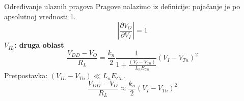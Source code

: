 \begin{frame}[label=09_1-s018]{Određivanje ulaznih pragova}\setlength{\parskip}{2pt}\setlength{\abovedisplayskip}{4pt}\setlength{\belowdisplayskip}{4pt}\setlength{\abovedisplayshortskip}{3pt}\setlength{\belowdisplayshortskip}{3pt}
Pragove nalazimo iz definicije: pojačanje je po apsolutnoj vrednosti 1.\[\left|\frac{\partial V_O}{\partial V_I}\right|=1\]
\textbf{$V_{IL}$: druga oblast}\[\frac{V_{DD}-V_O}{R_L}=\frac{k_n}{2}\frac1{1+\frac{(V_I-V_{Tn})}{L_nE_{Cn}}}(V_I-V_{Tn})^2\]
Pretpostavka: $(V_{IL}-V_{Tn})\ll L_nE_{Cn}$.\[\frac{V_{DD}-V_O}{R_L}\approx\frac{k_n}{2}(V_I-V_{Tn})^2\]

\end{frame}
